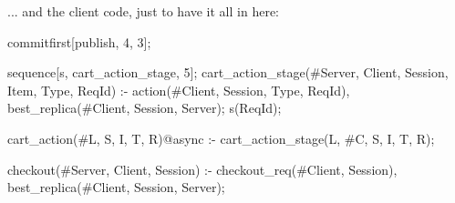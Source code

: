... and the client code, just to have it all in here:

\begin{Dedalus}
commitfirst[publish, 4, 3];

sequence[s, cart_action_stage, 5];
cart_action_stage(#Server, Client, Session, Item, Type, ReqId) :-
    action(#Client, Session, Type, ReqId),
    best_replica(#Client, Session, Server);
    s(ReqId);

cart_action(#L, S, I, T, R)@async :- 
    cart_action_stage(L, #C, S, I, T, R);

checkout(#Server, Client, Session) :-
    checkout_req(#Client, Session),
    best_replica(#Client, Session, Server);
\end{Dedalus}


